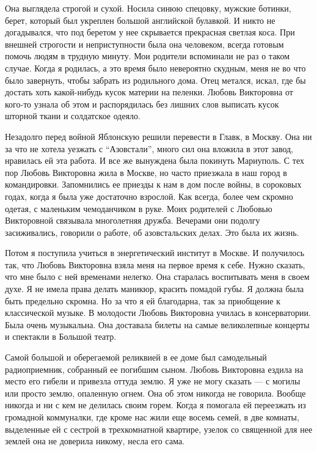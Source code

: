 Она выглядела строгой и сухой. Носила синюю спецовку, мужские ботинки, берет,
который был укреплен большой английской булавкой. И никто не догадывался, что
под беретом у нее скрывается прекрасная светлая коса. При внешней строгости и
неприступности была она человеком, всегда готовым помочь людям в трудную
минуту. Мои родители вспоминали не раз о таком случае. Когда я родилась, а это
время было невероятно скудным, меня не во что было завернуть, чтобы забрать из
родильного дома. Отец метался, искал, где бы достать хоть какой-нибудь кусок
материи на пеленки. Любовь Викторовна от кого-то узнала об этом и распорядилась
без лишних слов выписать кусок шторной ткани и солдатское одеяло.

Незадолго перед войной Яблонскую решили перевести в Главк, в Москву. Она ни за
что не хотела уезжать с \enquote{Азовстали}, много сил она вложила в этот завод,
нравилась ей эта работа. И все же вынуждена была покинуть Мариуполь. С тех пор
Любовь Викторовна  жила в Москве, но часто приезжала в наш город в
командировки. Запомнились ее приезды к нам в дом после войны, в сороковых
годах, когда я была уже достаточно взрослой. Как всегда, более чем скромно
одетая, с маленьким чемоданчиком в руке. Моих родителей с Любовью Викторовной
связывала многолетняя дружба. Вечерами они подолгу засиживались, говорили о
работе, об азовстальских делах. Это была их жизнь.

Потом я поступила учиться в энергетический институт в Москве. И получилось так,
что Любовь Викторовна взяла меня на первое время к себе. Нужно сказать, что мне
было с ней временами нелегко. Она старалась воспитывать меня в своем духе. Я не
имела права делать маникюр, красить помадой губы. Я должна была быть предельно
скромна. Но за что я ей благодарна, так за приобщение к классической музыке. В
молодости Любовь Викторовна училась в консерватории. Была очень музыкальна. Она
доставала билеты на самые великолепные концерты и спектакли в Большой театр.

Самой большой и оберегаемой реликвией в ее доме был самодельный радиоприемник,
собранный ее погибшим сыном. Любовь Викторовна ездила на место его гибели и
привезла оттуда землю. Я уже не могу сказать — с могилы или просто землю,
опаленную огнем. Она об этом никогда не говорила. Вообще никогда и ни с кем не
делилась своим горем. Когда я помогала ей переезжать из громадной коммуналки,
где кроме нас жили еще восемь семей, в две комнаты, выделенные ей с сестрой в
трехкомнатной квартире, узелок со священной для нее землей она не доверила
никому, несла его сама.

